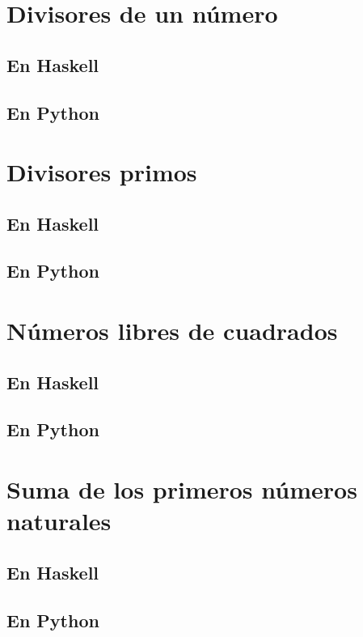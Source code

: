\documentclass[a4paper,12pt,twoside]{book}
\begin{document}
\section{Divisores de un número}
\subsection*{En Haskell}
\subsection*{En Python}

\section{Divisores primos}
\subsection*{En Haskell}
\subsection*{En Python}

\section{Números libres de cuadrados}
\subsection*{En Haskell}
\subsection*{En Python}

\section{Suma de los primeros números naturales}
\subsection*{En Haskell}
\subsection*{En Python}
\end{document}
